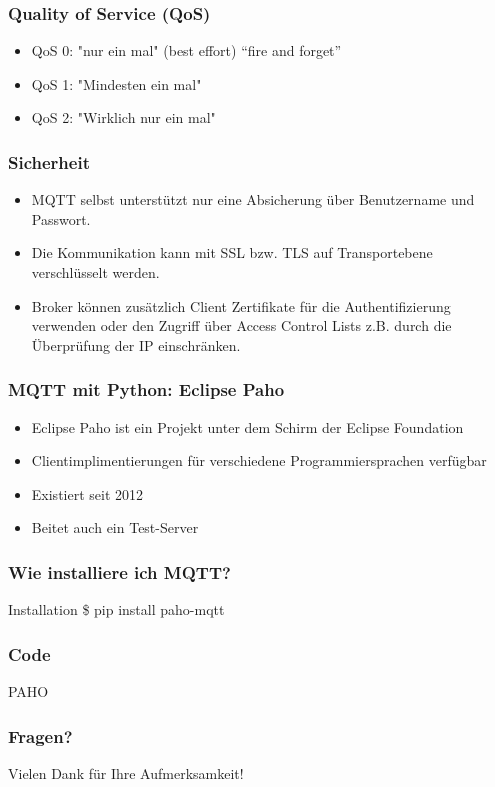 \documentclass[11pt]{beamer}
\begin{document}
\begin{frame}
	\frametitle{Quality of Service (QoS)} 
	\begin{itemize}
		\item QoS 0: "nur ein mal" (best effort) “fire and forget”
		\item QoS 1: "Mindesten ein mal"
		\item QoS 2: "Wirklich nur ein mal"
	\end{itemize}
\end{frame}

\begin{frame}
	\frametitle{Sicherheit}
	\begin{itemize}
		\item MQTT selbst unterstützt nur eine Absicherung über Benutzername und Passwort.
		\item Die Kommunikation kann mit SSL bzw. TLS auf Transportebene verschlüsselt werden.
		\item Broker können zusätzlich Client Zertifikate für die Authentifizierung verwenden oder den Zugriff über Access Control Lists z.B. durch die Überprüfung der IP einschränken.
	\end{itemize}
\end{frame}

\begin{frame}
	\frametitle{MQTT mit Python: Eclipse Paho} 
	\begin{itemize}
		\item Eclipse Paho ist ein Projekt unter dem Schirm der Eclipse Foundation
		\item Clientimplimentierungen für verschiedene Programmiersprachen verfügbar
		\item Existiert seit 2012
		\item Beitet auch ein Test-Server 
	\end{itemize}
\end{frame}

\begin{frame}
	\frametitle{Wie installiere ich MQTT?} 
		\begin{exampleblock}
		{Installation} \$ pip install paho-mqtt
	\end{exampleblock}
\end{frame}

\begin{frame}
	\frametitle{Code} 
	PAHO
\end{frame}

\begin{frame}
	\frametitle{Fragen?}
	\begin{center}
		Vielen Dank für Ihre Aufmerksamkeit!
	\end{center}
\end{frame}
\end{document}
